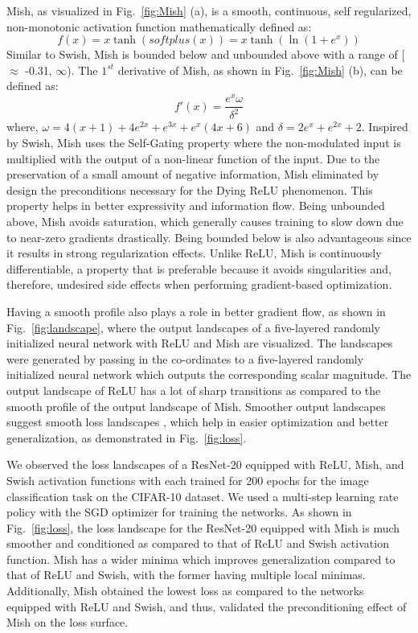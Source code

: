 \documentclass{bmvc2k}
\begin{document}
Mish, as visualized in Fig.~\ref{fig:Mish} (a), is a smooth, continuous, self regularized, non-monotonic activation function mathematically defined as:
\begin{equation}
f(x)=x\tanh(softplus(x))=x\tanh(\ln(1+e^{x}))
\end{equation}
Similar to Swish, Mish is bounded below and unbounded above with a range of [$\approx$ -0.31, $\infty$). The $1^{st}$ derivative of Mish, as shown in Fig.~\ref{fig:Mish} (b), can be defined as:
\begin{equation}
f'(x)=\frac{{e}^{x}\omega}{{\delta}^{2}}
\end{equation}
where, $\omega=4(x+1)+4{e}^{2x}+{e}^{3x}+{e}^{x}(4x+6)$ and $\delta=2{e}^{x}+{e}^{2x}+2$. Inspired by Swish, Mish uses the Self-Gating property where the non-modulated input is multiplied with the output of a non-linear function of the input. Due to the preservation of a small amount of negative information, Mish eliminated by design the preconditions necessary for the Dying ReLU phenomenon. This property helps in better expressivity and information flow. Being unbounded above, Mish avoids saturation, which generally causes training to slow down due to near-zero gradients \cite{glorot2010understanding} drastically. Being bounded below is also advantageous since it results in strong regularization effects. Unlike ReLU, Mish is continuously differentiable, a property that is preferable because it avoids singularities and, therefore, undesired side effects when performing gradient-based optimization. 

Having a smooth profile also plays a role in better gradient flow, as shown in Fig.~\ref{fig:landscape}, where the output landscapes of a five-layered randomly initialized neural network with ReLU and Mish are visualized.  The landscapes were generated by passing in the co-ordinates to a five-layered randomly initialized neural network which outputs the corresponding scalar magnitude. The output landscape of ReLU has a lot of sharp transitions as compared to the smooth profile of the output landscape of Mish. Smoother output landscapes suggest smooth loss landscapes \cite{li2018visualizing}, which help in easier optimization and better generalization, as demonstrated in Fig.~\ref{fig:loss}. 

We observed the loss landscapes \cite{li2018visualizing} of a ResNet-20 \cite{he2016deep} equipped with ReLU, Mish, and Swish activation functions with each trained for 200 epochs for the image classification task on the CIFAR-10 dataset. We used a multi-step learning rate policy with the SGD optimizer for training the networks. As shown in Fig.~\ref{fig:loss}, the loss landscape for the ResNet-20 equipped with Mish is much smoother and conditioned as compared to that of ReLU and Swish activation function. Mish has a wider minima which improves generalization compared to that of ReLU and Swish, with the former having multiple local minimas. Additionally, Mish obtained the lowest loss as compared to the networks equipped with ReLU and Swish, and thus, validated the preconditioning effect of Mish on the loss surface.
\end{document}
